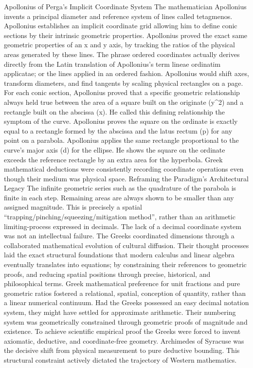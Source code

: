 {Apollonius of Perga’s Implicit Coordinate System
The mathematician Apollonius invents a principal diameter and reference system of lines called tetagmenos. Apollonius establishes an implicit coordinate grid allowing him to define conic sections by their intrinsic geometric properties. Apollonius proved the exact same geometric properties of an x and y axis, by tracking the ratios of the physical areas generated by these lines. The phrase ordered coordinates actually derives directly from the Latin translation of Apollonius’s term lineae ordinatim applicatae; or the lines applied in an ordered fashion. Apollonius would shift axes, transform diameters, and find tangents by scaling physical rectangles on a page. For each conic section, Apollonius proved that a specific geometric relationship always held true between the area of a square built on the originate (y^2) and a rectangle built on the abscissa (x). He called this defining relationship the symptom of the curve. Apollonius proves the square on the ordinate is exactly equal to a rectangle formed by the abscissa and the latus rectum (p) for any point on a parabola. Apollonius applies the same rectangle proportional to the curve’s major axis (d) for the ellipse. He shows the square on the ordinate exceeds the reference rectangle by an extra area for the hyperbola. Greek mathematical deductions were consistently recording coordinate operations even though their medium was physical space. 
Reframing the Paradigm’s Architectural Legacy
The infinite geometric series such as the quadrature of the parabola is finite in each step. Remaining areas are always shown to be smaller than any assigned magnitude. This is precisely a spatial “trapping/pinching/squeezing/mitigation method”, rather than an arithmetic limiting-process expressed in decimals. The lack of a decimal coordinate system was not an intellectual failure. The Greeks coordinated dimensions through a collaborated mathematical evolution of cultural diffusion. Their thought processes laid the exact structural foundations that modern calculus and linear algebra eventually translates into equations; by constraining their references to geometric proofs, and reducing spatial positions through precise, historical, and philosophical terms. 
Greek mathematical preference for unit fractions and pure geometric ratios fostered a relational, spatial, conception of quantity, rather than a linear numerical continuum. Had the Greeks possessed an easy decimal notation system, they might have settled for approximate arithmetic. Their numbering system was geometrically constrained through geometric proofs of magnitude and existence. To achieve scientific empirical proof the Greeks were forced to invent axiomatic, deductive, and coordinate-free geometry. Archimedes of Syracuse was the decisive shift from physical measurement to pure deductive bounding. This structural constraint actively dictated the trajectory of Western mathematics. 

}

